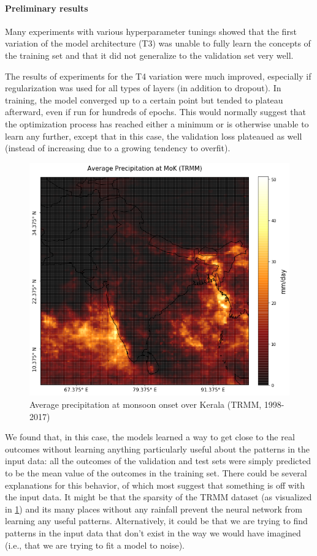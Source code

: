 \paragraph{Preliminary results}
\label{ssst:nn_t3_results}
Many experiments with various hyperparameter tunings showed that the first variation of the model architecture (T3) was unable to fully learn the concepts of the training set and that it did not generalize to the validation set very well.

The results of experiments for the T4 variation were much improved, especially if regularization was used for all types of layers (in addition to dropout). In training, the model converged up to a certain point but tended to plateau afterward, even if run for hundreds of epochs. This would normally suggest that the optimization process has reached either a minimum or is otherwise unable to learn any further, except that in this case, the validation loss plateaued as well (instead of increasing due to a growing tendency to overfit).

\begin{figure}[h!]
  \centering
  \includegraphics[width=0.5\linewidth]{./99_appendix/img/prec_avg_onset}
  \caption{Average precipitation at monsoon onset over Kerala (TRMM, 1998-2017)}
  \label{fig:trmm_prec_onset}
\end{figure}

We found that, in this case, the models learned a way to get close to the real outcomes without learning anything particularly useful about the patterns in the input data: all the outcomes of the validation and test sets were simply predicted to be the mean value of the outcomes in the training set. There could be several explanations for this behavior, of which most suggest that something is off with the input data. It might be that the sparsity of the TRMM dataset (as visualized in \cref{fig:trmm_prec_onset}) and its many places without any rainfall prevent the neural network from learning any useful patterns. Alternatively, it could be that we are trying to find patterns in the input data that don't exist in the way we would have imagined (i.e., that we are trying to fit a model to noise).

